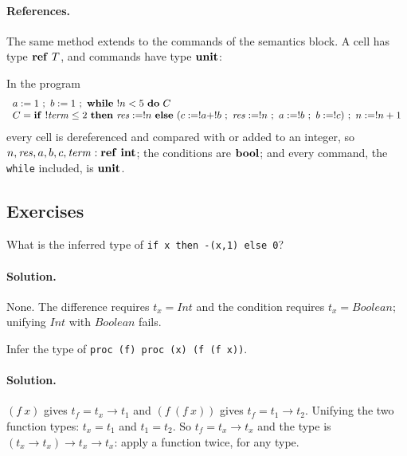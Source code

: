 \paragraph{References.} The same method extends to the commands of the
semantics block. A cell has type $\mathbf{ref}\ T$, and commands have type $\mathbf{unit}$:
In the program
\[
\begin{array}{l}
\assign{a}{1}\ ;\ \assign{b}{1}\ ;\ \whiledo{\deref{n} < 5}{C} \\
C = \ift{\deref{\mathit{term}} \le 2}{\assign{\mathit{res}}{\deref{n}}}{(\assign{c}{\deref{a} + \deref{b}}\ ;\ \assign{\mathit{res}}{\deref{n}}\ ;\ \assign{a}{\deref{b}}\ ;\ \assign{b}{\deref{c}})}\ ;\ \assign{n}{\deref{n} + 1}
\end{array}
\]
every cell is dereferenced and compared with or added to an integer, so
$n, \mathit{res}, a, b, c, \mathit{term} : \mathbf{ref}\ \mathbf{int}$; the conditions are $\mathbf{bool}$; and
every command, the \texttt{while} included, is $\mathbf{unit}$.

\subsection{Exercises}

\begin{exercise}
What is the inferred type of \texttt{if x then -(x,1) else 0}?
\end{exercise}

\paragraph{Solution.} None. The difference requires $t_x = \mathit{Int}$ and the
condition requires $t_x = \mathit{Boolean}$; unifying $\mathit{Int}$ with
$\mathit{Boolean}$ fails.

\begin{exercise}
Infer the type of \texttt{proc (f) proc (x) (f (f x))}.
\end{exercise}

\paragraph{Solution.} $(f\ x)$ gives $t_f = t_x \to t_1$ and $(f\ (f\ x))$ gives
$t_f = t_1 \to t_2$. Unifying the two function types: $t_x = t_1$ and $t_1 = t_2$.
So $t_f = t_x \to t_x$ and the type is $(t_x \to t_x) \to t_x \to t_x$: apply a function
twice, for any type.

